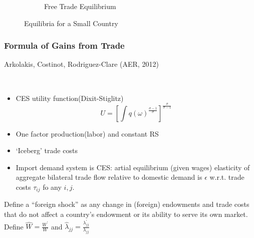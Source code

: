 \begin{figure}[ht]
\begin{subfigure}{0.48\textwidth}
        \caption{Free Trade Equilibrium}
    \end{subfigure}
    \caption{Equilibria for a Small Country}
    \label{fig:trade_equilibria}
\end{figure}

\subsubsection{Formula of Gains from Trade}
Arkolakis, Costinot, Rodriguez-Clare (AER, 2012)

\begin{assumption}
    \

    \begin{itemize}
        \item CES utility function(Dixit-Stiglitz)
        \[U = \left[\int q(\omega)^{\frac{\sigma -1}{\sigma}}\right]^{\frac{\sigma}{\sigma -1}}\] 
        \item One factor production(labor) and constant RS
        \item `Iceberg' trade costs
        \item Import demand system is CES: artial equilibrium (given wages)
        elasticity of aggregate bilateral trade flow relative to domestic
        demand is $\epsilon $ w.r.t. trade costs $\tau_{ij}$ fo any $i,j$.
    \end{itemize}
\end{assumption}

Define a “foreign shock” as any change in (foreign) endowments and
trade costs that do not affect a country's endowment or its ability to
serve its own market. Define $\hat{W} = \frac{W^{\prime}}{W}$ and $\hat{\lambda}_{jj} = \frac{\lambda_{jj}^{\prime} }{\lambda_{jj}}$


